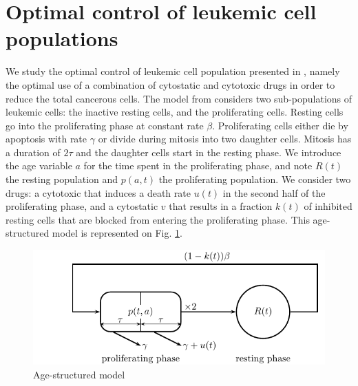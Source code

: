 \documentclass[a4paper]{article}
\begin{document}
\section{Optimal control of leukemic cell populations}
We study the optimal control of leukemic cell population presented in \cite{Dupuis14}, namely the optimal use of a combination of 
cytostatic and cytotoxic drugs in order to reduce the total cancerous cells.
The model from \cite{Adimy08,Mackey78} considers two sub-populations of leukemic cells: the inactive resting cells, and the proliferating cells.
Resting cells  go into the proliferating phase at constant rate $\beta$.
Proliferating cells either die by apoptosis with rate $\gamma$ or divide during mitosis into two daughter cells.
Mitosis has a duration of $2 \tau$ and the daughter cells start in the resting phase.
We introduce the age variable $a$ for the time spent in the proliferating phase, and note $R(t)$ the resting population and $p(a,t)$ the proliferating population.
We consider two drugs: a cytotoxic that induces a death rate $u(t)$ in the second half of the proliferating phase, and a cytostatic $v$ that results in a fraction
$k(t)$ of inhibited resting cells that are blocked from entering the proliferating phase.
This age-structured model is represented on Fig. \ref{fig:hematoModel}.
\begin{figure}[h!]
\includegraphics{hematoModel}
\caption{\label{fig:hematoModel} Age-structured model}
\end{figure}
\end{document}
